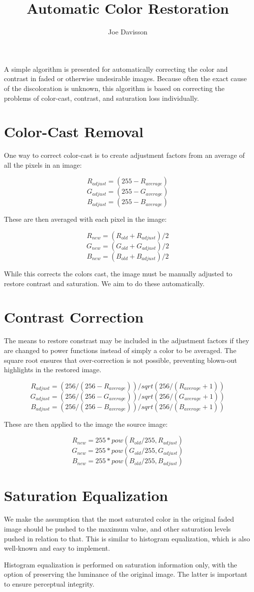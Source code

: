 \documentclass{article}
\title{Automatic Color Restoration}
\author{Joe Davisson} %
\begin{document}
\maketitle

A simple algorithm is presented for automatically correcting the
color and contrast in faded or otherwise undesirable images.
Because often the exact cause of the discoloration is unknown, this
algorithm is based on correcting the problems of color-cast,
contrast, and saturation loss individually.

\section{Color-Cast Removal}

One way to correct color-cast is to create adjustment factors from an
average of all the pixels in an image:

\[ R_{adjust} = (255 - R_{average}) \]
\[ G_{adjust} = (255 - G_{average}) \]
\[ B_{adjust} = (255 - B_{average}) \]

These are then averaged with each pixel in the image:

\[ R_{new} = (R_{old} + R_{adjust}) / 2 \]
\[ G_{new} = (G_{old} + G_{adjust}) / 2 \]
\[ B_{new} = (B_{old} + B_{adjust}) / 2 \]

While this corrects the colors cast, the image must be manually adjusted
to restore contrast and saturation. We aim to do these automatically.

\section{Contrast Correction}

The means to restore constrast may be included in the adjustment factors if
they are changed to power functions instead of simply a color to be averaged.
The square root ensures that over-correction is not possible, preventing
blown-out highlights in the restored image.

\[ R_{adjust} = (256 / (256 - R_{average})) / sqrt(256 / (R_{average} + 1)) \]
\[ G_{adjust} = (256 / (256 - G_{average})) / sqrt(256 / (G_{average} + 1)) \]
\[ B_{adjust} = (256 / (256 - B_{average})) / sqrt(256 / (B_{average} + 1)) \]

These are then applied to the image the source image:

\[ R_{new} = 255 * pow(R_{old} / 255, R_{adjust}) \]
\[ G_{new} = 255 * pow(G_{old} / 255, G_{adjust}) \]
\[ B_{new} = 255 * pow(B_{old} / 255, B_{adjust}) \]

\section{Saturation Equalization}

We make the assumption that the most saturated color in the original faded
image should be pushed to the maximum value, and other saturation levels pushed in relation to that. This is similar to histogram equalization, which is also
well-known and easy to implement.

Histogram equalization is performed on saturation information only, with the option of preserving the luminance of the original image. The latter is important to ensure perceptual integrity.
\end{document}
